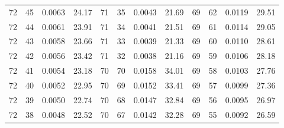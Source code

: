 \begin{tabular}{llll|llll|llll}
72 & 45 & 0.0063 & 24.17 & 71 & 35 & 0.0043 & 21.69 & 69 & 62 & 0.0119 & 29.51\\
72 & 44 & 0.0061 & 23.91 & 71 & 34 & 0.0041 & 21.51 & 69 & 61 & 0.0114 & 29.05\\
72 & 43 & 0.0058 & 23.66 & 71 & 33 & 0.0039 & 21.33 & 69 & 60 & 0.0110 & 28.61\\
72 & 42 & 0.0056 & 23.42 & 71 & 32 & 0.0038 & 21.16 & 69 & 59 & 0.0106 & 28.18\\
72 & 41 & 0.0054 & 23.18 & 70 & 70 & 0.0158 & 34.01 & 69 & 58 & 0.0103 & 27.76\\
72 & 40 & 0.0052 & 22.95 & 70 & 69 & 0.0152 & 33.41 & 69 & 57 & 0.0099 & 27.36\\
72 & 39 & 0.0050 & 22.74 & 70 & 68 & 0.0147 & 32.84 & 69 & 56 & 0.0095 & 26.97\\
72 & 38 & 0.0048 & 22.52 & 70 & 67 & 0.0142 & 32.28 & 69 & 55 & 0.0092 & 26.59\\
\bottomrule
\end{tabular}
\newpage
